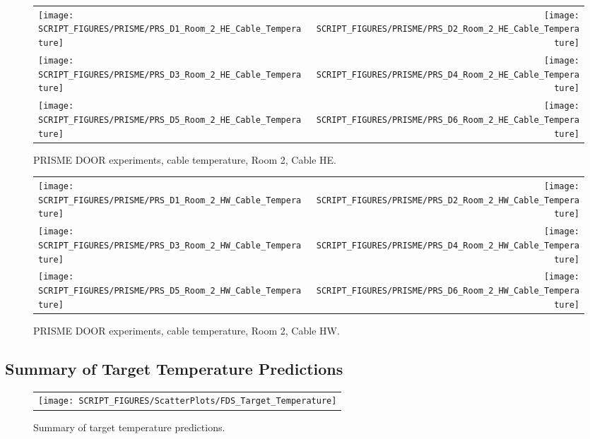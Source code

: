 \begin{figure}[p]
\begin{tabular*}{\textwidth}{l@{\extracolsep{\fill}}r}
\texttt{[image: SCRIPT\_FIGURES/PRISME/PRS\_D1\_Room\_2\_HE\_Cable\_Temperature]} &
\texttt{[image: SCRIPT\_FIGURES/PRISME/PRS\_D2\_Room\_2\_HE\_Cable\_Temperature]} \\
\texttt{[image: SCRIPT\_FIGURES/PRISME/PRS\_D3\_Room\_2\_HE\_Cable\_Temperature]} &
\texttt{[image: SCRIPT\_FIGURES/PRISME/PRS\_D4\_Room\_2\_HE\_Cable\_Temperature]} \\
\texttt{[image: SCRIPT\_FIGURES/PRISME/PRS\_D5\_Room\_2\_HE\_Cable\_Temperature]} &
\texttt{[image: SCRIPT\_FIGURES/PRISME/PRS\_D6\_Room\_2\_HE\_Cable\_Temperature]}
\end{tabular*}
\caption{PRISME DOOR experiments, cable temperature, Room 2, Cable HE.}
\label{PRISME_HE_Cable_Room_2}
\end{figure}

\begin{figure}[p]
\begin{tabular*}{\textwidth}{l@{\extracolsep{\fill}}r}
\texttt{[image: SCRIPT\_FIGURES/PRISME/PRS\_D1\_Room\_2\_HW\_Cable\_Temperature]} &
\texttt{[image: SCRIPT\_FIGURES/PRISME/PRS\_D2\_Room\_2\_HW\_Cable\_Temperature]} \\
\texttt{[image: SCRIPT\_FIGURES/PRISME/PRS\_D3\_Room\_2\_HW\_Cable\_Temperature]} &
\texttt{[image: SCRIPT\_FIGURES/PRISME/PRS\_D4\_Room\_2\_HW\_Cable\_Temperature]} \\
\texttt{[image: SCRIPT\_FIGURES/PRISME/PRS\_D5\_Room\_2\_HW\_Cable\_Temperature]} &
\texttt{[image: SCRIPT\_FIGURES/PRISME/PRS\_D6\_Room\_2\_HW\_Cable\_Temperature]}
\end{tabular*}
\caption{PRISME DOOR experiments, cable temperature, Room 2, Cable HW.}
\label{PRISME_HW_Cable_Room_2}
\end{figure}



\clearpage

\subsection{Summary of Target Temperature Predictions}
\label{Target Temperature}


\begin{figure}[h!]
\begin{center}
\begin{tabular}{c}
\texttt{[image: SCRIPT\_FIGURES/ScatterPlots/FDS\_Target\_Temperature]}
\end{tabular}
\end{center}
\caption[Summary of target temperature predictions]
{Summary of target temperature predictions.}
\end{figure}

